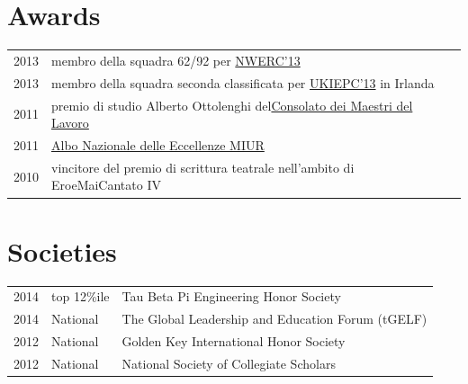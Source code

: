 \documentclass[a4paper]{deedy-resume} %
\begin{document}
\begin{minipage}[t]{0.66\textwidth}
\sectionspace %



\begin{tightitemize}
\item
\end{tightitemize}

\sectionspace %


\section{Awards} 

\begin{tabular}{rll}
2013	 & membro della squadra 62/92 per \href{http://www.nwerc.eu/}{NWERC'13}\\
2013	 & membro della squadra seconda classificata per \href{http://www.cs.nott.ac.uk/~mlw/ukiepc/}{UKIEPC'13} in Irlanda\\
2011	 & premio di studio Alberto Ottolenghi del\href{http://www.maestrilavoro.it/index/elenco_consolati/it-toscana-pisa.html}{Consolato dei Maestri del Lavoro}\\
2011	 & \href{http://www.indire.it/eccellenze/}{Albo Nazionale delle Eccellenze MIUR}\\
2010	 & vincitore del premio di scrittura teatrale nell'ambito di EroeMaiCantato IV\\
\end{tabular}

\sectionspace %


\section{Societies} 

\begin{tabular}{rll}
2014 & top 12\%ile & Tau Beta Pi Engineering Honor Society\\
2014 & National & The Global Leadership and Education Forum (tGELF)\\
2012 & National & Golden Key International Honor Society\\
2012 & National & National Society of Collegiate Scholars\\
\end{tabular}

\sectionspace %


\end{minipage} %
\end{document}
